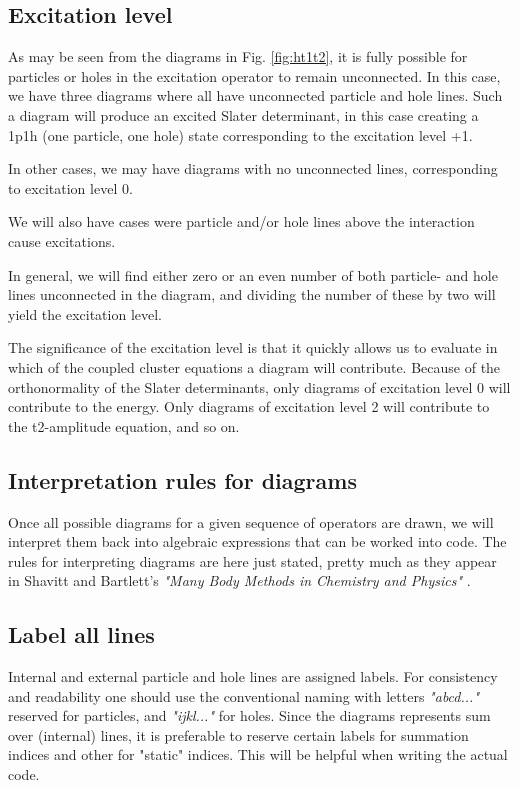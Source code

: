 \subsection{Excitation level}

As may be seen from the diagrams in Fig. \ref{fig:ht1t2}, it is
fully possible for particles or holes in the excitation operator to
remain unconnected. In this case, we have three diagrams where all
have unconnected particle and hole lines. Such a diagram will produce
an excited Slater determinant, in this case creating a 1p1h (one
particle, one hole) state corresponding to the excitation level +1.

In other cases, we may have diagrams with no unconnected lines, corresponding to excitation level 0.

We will also have cases were particle and/or hole lines above the interaction cause excitations.

In general, we will find either zero or an even number of both particle- and hole lines unconnected in the diagram, and dividing the number of these by two will yield the excitation level.

The significance of the excitation level is that it quickly allows us to evaluate in which of the coupled cluster equations a diagram will contribute. Because of the orthonormality of the Slater determinants, only diagrams of excitation level 0 will contribute to the energy. Only diagrams of excitation level 2 will contribute to the t2-amplitude equation, and so on.

\subsection{Interpretation rules for diagrams}

Once all possible diagrams for a given sequence of operators are drawn, we will interpret them back into algebraic expressions that can be worked into code. The rules for interpreting diagrams are here just stated, pretty much as they appear in Shavitt and Bartlett's \emph{"Many Body Methods in Chemistry and Physics"} \cite[Chapter 9]{ShavittBartlett2009}.

\subsection{Label all lines}

Internal and external particle and hole lines are assigned labels. For consistency and readability one should use the conventional naming with letters \emph{"abcd..."} reserved for particles, and \emph{"ijkl..."} for holes. Since the diagrams represents sum over (internal) lines, it is preferable to reserve certain labels for summation indices and other for "static" indices. This will be helpful when writing the actual code.

